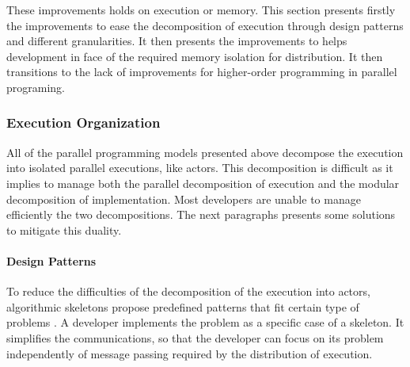 These improvements holds on execution or memory.
This section presents firstly the improvements to ease the decomposition of execution through design patterns and different granularities.
It then presents the improvements to helps development in face of the required memory isolation for distribution.
It then transitions to the lack of improvements for higher-order programming in parallel programing.

\subsubsection{Execution Organization}

All of the parallel programming models presented above decompose the execution into isolated parallel executions, like actors.
This decomposition is difficult as it implies to manage both the parallel decomposition of execution and the modular decomposition of implementation.
Most developers are unable to manage efficiently the two decompositions.
The next paragraphs presents some solutions to mitigate this duality.

\paragraph{Design Patterns}

To reduce the difficulties of the decomposition of the execution into actors, algorithmic skeletons propose predefined patterns that fit certain type of problems \cite{Cole1988, Dean2008, McCool2010, Gonzalez-Velez2010}.
A developer implements the problem as a specific case of a skeleton.
It simplifies the communications, so that the developer can focus on its problem independently of message passing required by the distribution of execution.



